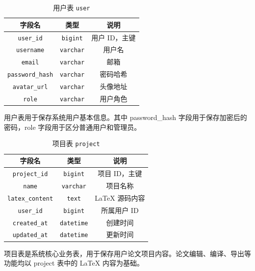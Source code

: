 \documentclass{xduugthesis}
\begin{document}
\begin{table}[!ht]
    \centering
    \caption{用户表 \texttt{user}}
    \label{tab:user}
    \begin{tabular}{|c|c|c|}
        \hline
        \textbf{字段名} & \textbf{类型} & \textbf{说明} \\ \hline
        \texttt{user\_id} & \texttt{bigint} & 用户 ID，主键 \\ \hline
        \texttt{username} & \texttt{varchar} & 用户名 \\ \hline
        \texttt{email} & \texttt{varchar} & 邮箱 \\ \hline
        \texttt{password\_hash} & \texttt{varchar} & 密码哈希 \\ \hline
        \texttt{avatar\_url} & \texttt{varchar} & 头像地址 \\ \hline
        \texttt{role} & \texttt{varchar} & 用户角色 \\ \hline
    \end{tabular}
\end{table}

用户表用于保存系统用户基本信息。其中 password\_hash 字段用于保存加密后的密码，role 字段用于区分普通用户和管理员。

\begin{table}[!ht]
    \centering
    \caption{项目表 \texttt{project}}
    \label{tab:project}
    \begin{tabular}{|c|c|c|}
        \hline
        \textbf{字段名} & \textbf{类型} & \textbf{说明} \\ \hline
        \texttt{project\_id} & \texttt{bigint} & 项目 ID，主键 \\ \hline
        \texttt{name} & \texttt{varchar} & 项目名称 \\ \hline
        \texttt{latex\_content} & \texttt{text} & LaTeX 源码内容 \\ \hline
        \texttt{user\_id} & \texttt{bigint} & 所属用户 ID \\ \hline
        \texttt{created\_at} & \texttt{datetime} & 创建时间 \\ \hline
        \texttt{updated\_at} & \texttt{datetime} & 更新时间 \\ \hline
    \end{tabular}
\end{table}

项目表是系统核心业务表，用于保存用户论文项目内容。论文编辑、编译、导出等功能均以 project 表中的 LaTeX 内容为基础。
\end{document}
